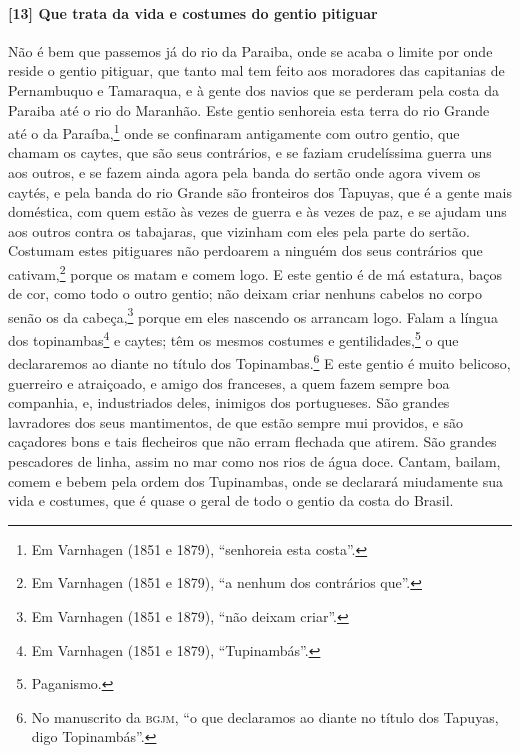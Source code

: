 \begin{linenumbers}
\paragraph{[13] Que trata da vida e costumes do gentio pitiguar} \quad
Não é bem que passemos já do rio da Paraiba, onde se acaba o limite por onde reside o
gentio pitiguar, que tanto mal tem feito aos moradores das capitanias de Pernambuquo e
Tamaraqua, e à gente dos navios que se perderam pela costa da Paraiba até o rio do
Maranhão. Este gentio senhoreia esta terra do rio Grande até o da Paraíba,\footnote{ Em
Varnhagen (1851 e 1879), ``senhoreia esta costa''.} onde se confinaram antigamente com
outro gentio, que chamam os caytes, que são seus contrários, e se faziam crudelíssima
guerra uns aos outros, e se fazem ainda agora pela banda do sertão onde agora vivem os
caytés, e pela banda do rio Grande são fronteiros dos Tapuyas, que é a gente mais
doméstica, com quem estão às vezes de guerra e às vezes de paz, e se ajudam uns aos outros
contra os tabajaras, que vizinham com eles pela parte do sertão. Costumam estes pitiguares
não perdoarem a ninguém dos seus contrários que cativam,\footnote{ Em Varnhagen (1851 e
1879), ``a nenhum dos contrários que''.} porque os matam e comem logo. E este gentio é de
má estatura, baços de cor, como todo o outro gentio; não deixam criar nenhuns cabelos no
corpo senão os da cabeça,\footnote{ Em Varnhagen (1851 e 1879), ``não deixam criar''.}
porque em eles nascendo os arrancam logo. Falam a língua dos topinambas\footnote{ Em
Varnhagen (1851 e 1879), ``Tupinambás''.} e caytes; têm os mesmos costumes e
gentilidades,\footnote{ Paganismo.} o que declararemos ao diante no título dos
Topinambas.\footnote{ No manuscrito da \textsc{bgjm}, ``o que declaramos ao diante no
título dos Tapuyas, digo Topinambás''.} E este gentio é muito belicoso, guerreiro e
atraiçoado, e amigo dos franceses, a quem fazem sempre boa companhia, e, industriados
deles, inimigos dos portugueses. São grandes lavradores dos seus mantimentos, de que estão
sempre mui providos, e são caçadores bons e tais flecheiros que não erram flechada que
atirem. São grandes pescadores de linha, assim no mar como nos rios de água doce. Cantam,
bailam, comem e bebem pela ordem dos Tupinambas, onde se declarará miudamente sua vida e
costumes, que é quase o geral de todo o gentio da costa do Brasil.


\end{linenumbers}
